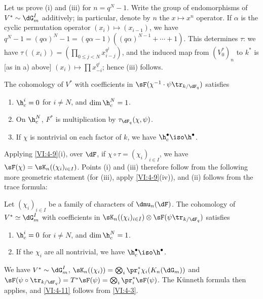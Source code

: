 Let us prove (i) and (iii) for $n=q^N-1$. Write the group of 
endomorphisms of $V^\ast\sim \dG_m^I$ additively; in particular, denote by $n$ 
the $x\mapsto x^n$ operator. If $\alpha$ is the cyclic permutation operator 
$(x_i)\mapsto (x_{i-1})$, we have 
$q^N-1=(q\alpha)^N-1 = (q\alpha-1)((q\alpha)^{N-1}+\cdots + 1)$. This 
determines $\tau$: we have $\tau((x_i)) = (\prod_{0\leqslant j<N} x_{i-j}^{q^j})$, 
and the induced map from $(V_0^\ast)_n$ to $k^\ast$ is [as in a) above] 
$(x_i)\mapsto \prod x_{-i}^{q^i}$; hence (iii) follows. 





\begin{proposition_}\label{VI:4-10}
The cohomology of $V^\ast$ with coefficients in 
$\sF(\chi^{-1}\cdot \psi\tr_{k/\dF_q})$ satisfies 
\begin{enumerate}[\indent (i)]
  \item $\h_c^i = 0$ for $i\ne N$, and $\dim \h_c^N=1$. 
  \item On $\h_c^N$, $F^\ast$ is multiplication by 
    $\tau_{\dF_q}(\chi,\psi)$. 
  \item If $\chi$ is nontrivial on each factor of $k$, we have 
    $\h_c^\bullet \iso \h^\bullet$. 
\end{enumerate}
\end{proposition_}

Applying \ref{VI:4-9}(i), over $\dF$, if $\chi\circ \tau=(\chi_i)_{i\in I}$, 
we have $\sF(\chi) = \sK_n((\chi_i)_{i\in I})$. Points (i) and (iii) 
therefore follow from the following more geometric statement (for (iii), 
apply \ref{VI:4-9}(iv)), and (ii) follows from the trace formula: 





\begin{proposition_}\label{VI:4-11}
Let $(\chi_i)_{i\in I}$ be a family of characters of $\dmu_n(\dF)$. The 
cohomology of $V^\ast\simeq \dG_m^I$ with coefficients in 
$\sK_n((\chi_i)_{i\in I})\otimes \sF(\psi\tr_{k/\dF_q})$ satisfies 
\begin{enumerate}[\indent (i)]
  \item $\h_c^i{}=0$ for $i\ne N$, and $\dim \h_c^N{} = 1$. 
  \item If the $\chi_i$ are all nontrivial, we have 
    $\h_c^\bullet{}\iso \h^\bullet$. 
\end{enumerate}
\end{proposition_}

We have $V^\ast\sim \dG_m^I$, 
$\sK_n((\chi_i)) = \bigotimes_i \pr_i^\ast \chi_i(K_n(\dG_m))$ and 
$\sF(\psi\circ \tr_{k/\dF_q})=T^\ast \sF(\psi) = \bigotimes_i \pr_i^\ast \sF(\psi)$. 
The K\"unneth formula then applies, and \ref{VI:4-11} follows from 
\ref{VI:4-3}. 





